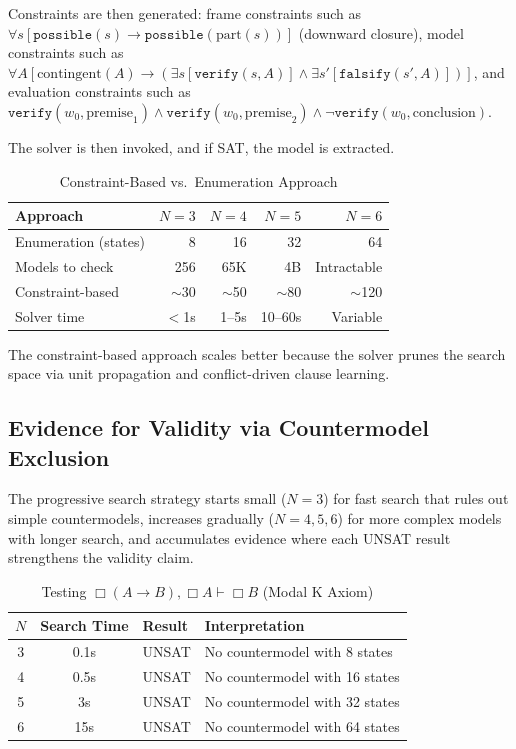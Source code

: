 \documentclass[pdflatex,sn-mathphys-num]{sn-jnl}
\newcommand{\nec}{\Box}                     %
\newcommand{\imp}{\to}                      %
\newcommand{\lneg}{\neg}                    %
\newcommand{\zverify}{\texttt{verify}}
\newcommand{\zfalsify}{\texttt{falsify}}
\newcommand{\zpossible}{\texttt{possible}}
\theoremstyle{thmstyleone}
\theoremstyle{thmstyletwo}
\theoremstyle{thmstylethree}
\begin{document}
Constraints are then generated: frame constraints such as $\forall s[\zpossible(s) \imp \zpossible(\text{part}(s))]$ (downward closure), model constraints such as $\forall A[\text{contingent}(A) \imp (\exists s[\zverify(s,A)] \land \exists s'[\zfalsify(s',A)])]$, and evaluation constraints such as $\zverify(w_0, \text{premise}_1) \land \zverify(w_0, \text{premise}_2) \land \lneg \zverify(w_0, \text{conclusion})$.

The solver is then invoked, and if SAT, the model is extracted.

\begin{table}[htbp]
\centering
\caption{Constraint-Based vs.\ Enumeration Approach}
\label{tab:constraint-vs-enum}
\begin{tabular}{@{}lrrrr@{}}
\toprule
\textbf{Approach} & $N=3$ & $N=4$ & $N=5$ & $N=6$ \\
\midrule
Enumeration (states) & 8 & 16 & 32 & 64 \\
Models to check & 256 & 65K & 4B & Intractable \\
Constraint-based & $\sim$30 & $\sim$50 & $\sim$80 & $\sim$120 \\
Solver time & $<$1s & 1--5s & 10--60s & Variable \\
\bottomrule
\end{tabular}
\end{table}

The constraint-based approach scales better because the solver prunes the search space via unit propagation and conflict-driven clause learning.

\subsection{Evidence for Validity via Countermodel Exclusion}\label{sec:validity-evidence}

The progressive search strategy starts small ($N=3$) for fast search that rules out simple countermodels, increases gradually ($N=4, 5, 6$) for more complex models with longer search, and accumulates evidence where each UNSAT result strengthens the validity claim.

\begin{table}[htbp]
\centering
\caption{Testing $\nec(A \imp B), \nec A \vdash \nec B$ (Modal K Axiom)}
\label{tab:k-axiom}
\begin{tabular}{@{}ccll@{}}
\toprule
$N$ & \textbf{Search Time} & \textbf{Result} & \textbf{Interpretation} \\
\midrule
3 & 0.1s & UNSAT & No countermodel with 8 states \\
4 & 0.5s & UNSAT & No countermodel with 16 states \\
5 & 3s & UNSAT & No countermodel with 32 states \\
6 & 15s & UNSAT & No countermodel with 64 states \\
\bottomrule
\end{tabular}
\end{table}
\end{document}
